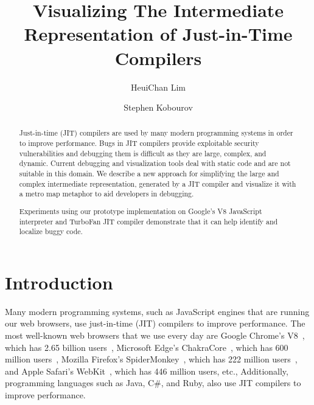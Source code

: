 \documentclass[runningheads]{llncs}
\begin{document}
%
\title{Visualizing The Intermediate Representation of Just-in-Time Compilers}
%
%
\author{HeuiChan Lim \and
Stephen Kobourov}
%
%
%
%
\maketitle              %
%

\begin{abstract}
Just-in-time (JIT) compilers are used by many modern programming systems in order to improve performance. Bugs in JIT compilers provide exploitable security vulnerabilities and debugging them is difficult as they are large, complex, and dynamic. Current debugging and visualization tools deal with static code and are not suitable in this domain. 
We describe a new approach for simplifying the large and complex intermediate representation, generated by a JIT compiler and visualize it with a metro map metaphor to aid developers in debugging.

Experiments using our prototype implementation  on Google’s V8 JavaScript interpreter and TurboFan JIT compiler demonstrate that it can help identify and localize buggy code.

\end{abstract}

\section{Introduction}\label{sec:introduction}

Many modern programming systems, such as JavaScript engines that are running our web browsers, use just-in-time (JIT) compilers to improve performance. The most well-known web browsers that we use every day are Google Chrome's V8~\cite{v8}, which has 2.65 billion users~\cite{chromestat}, Microsoft Edge's ChakraCore~\cite{chakracore}, which has 600 million users~\cite{edgestat}, Mozilla Firefox's SpiderMonkey~\cite{spidermonkey}, which has 222 million users~\cite{firefoxstat}, and Apple Safari's WebKit~\cite{javascriptcore}, which has 446 million users\cite{safaristat}, etc., Additionally, programming languages such as Java, C\#, and Ruby, also use JIT compilers to improve performance.
\end{document}
